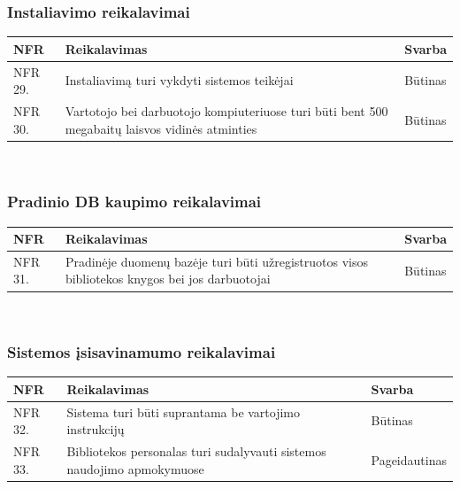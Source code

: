\documentclass{VUMIFPSkursinis}
\begin{document}
    \subsubsection{Instaliavimo reikalavimai}
    \noindent
    \begin{centering}
    	\begin{tabular}{ | p{} | p{} | p{} |}
    		\hline
   			NFR & Reikalavimas & Svarba       \\ \hline
		  	NFR 29. & Instaliavimą turi vykdyti sistemos teikėjai & Būtinas \\ \hline
            NFR 30. & Vartotojo bei darbuotojo kompiuteriuose turi būti bent 500 megabaitų laisvos vidinės atminties & Būtinas \\ \hline
   		\end{tabular}\\
    \end{centering}
    
    \subsubsection{Pradinio DB kaupimo reikalavimai}
    \noindent
    \begin{centering}
    	\begin{tabular}{ | p{} | p{} | p{} |}
    		\hline
   			NFR & Reikalavimas & Svarba       \\ \hline
		  	NFR 31. & Pradinėje duomenų bazėje turi būti užregistruotos visos bibliotekos knygos bei jos darbuotojai & Būtinas \\ \hline
   		\end{tabular}\\
    \end{centering}
    
    \subsubsection{Sistemos įsisavinamumo reikalavimai}
    \noindent
    \begin{centering}
    	\begin{tabular}{ | p{} | p{} | p{} |}
    		\hline
   			NFR & Reikalavimas & Svarba       \\ \hline
		  	NFR 32. & Sistema turi būti suprantama be vartojimo instrukcijų & Būtinas \\ \hline
            NFR 33. & Bibliotekos personalas turi sudalyvauti sistemos naudojimo apmokymuose & Pageidautinas \\ \hline
   		\end{tabular}\\
    \end{centering}
\end{document}
